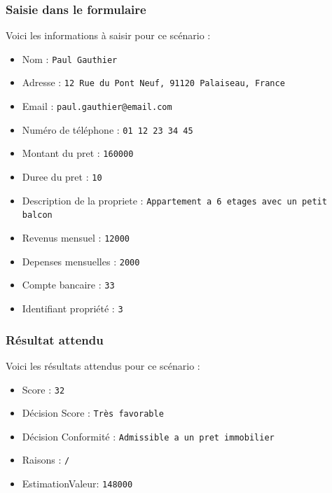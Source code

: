 \documentclass{article}
\begin{document}
        \subsubsection{Saisie dans le formulaire}
        Voici les informations à saisir pour ce scénario :
        \begin{itemize}
            \item Nom : \texttt{Paul Gauthier}
            \item Adresse : \texttt{12 Rue du Pont Neuf, 91120 Palaiseau, France}  
            \item Email : \texttt{paul.gauthier@email.com}  
            \item Numéro de téléphone : \texttt{01 12 23 34 45}  
            \item Montant du pret : \texttt{160000}  
            \item Duree du pret : \texttt{10}  
            \item Description de la propriete : \texttt{Appartement a 6 etages avec un petit balcon}  
            \item Revenus mensuel : \texttt{12000}
            \item Depenses mensuelles : \texttt{2000}
            \item Compte bancaire : \texttt{33}
            \item Identifiant propriété : \texttt{3}
        \end{itemize}
        
        \subsubsection{Résultat attendu}
        Voici les résultats attendus pour ce scénario :
        \begin{itemize}
            \item Score : \texttt{32}
            \item Décision Score : \texttt{Très favorable}
            \item Décision Conformité : \texttt{Admissible a un pret immobilier}
            \item Raisons : \texttt{/}
            \item EstimationValeur: \texttt{148000}
        \end{itemize}
        
\end{document}
